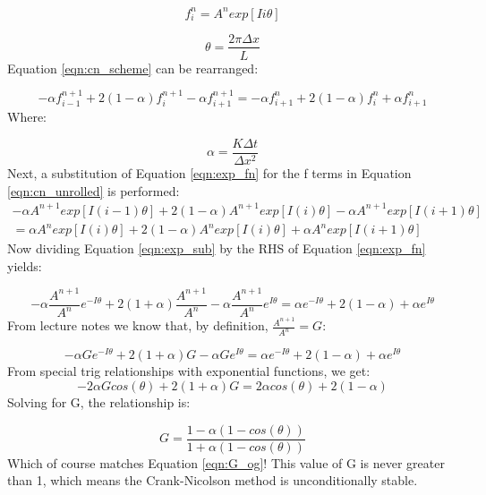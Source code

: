 \documentclass[12pt]{article}
\begin{document}
\begin{equation}
f_i^n = A^n exp\left[Ii\theta\right]
\label{eqn:exp_fn}
\end{equation}
	
\begin{equation}
\theta = \frac{2\pi \Delta x}{L}
\end{equation}
\noindent
Equation \ref{eqn:cn_scheme} can be rearranged:

\begin{equation}
 -\alpha f_{i-1}^{n+1} + 2(1-\alpha)f_i^{n+1} -\alpha f_{i+1}^{n+1} = - \alpha f_{i+1}^n + 2(1-\alpha)f_i^n + \alpha f^n_{i+1}
 \label{eqn:cn_unrolled}
\end{equation}
\noindent
Where:

\begin{equation}
	\alpha = \frac{K \Delta t}{\Delta x^2}
\end{equation}
\noindent
Next, a substitution of Equation \ref{eqn:exp_fn} for the f terms in Equation \ref{eqn:cn_unrolled} is performed:
\begin{equation}
\begin{aligned}
	 -\alpha A^{n+1} exp\left[I(i-1)\theta\right] + 2(1-\alpha)A^{n+1} exp\left[I(i)\theta\right] -\alpha A^{n+1} exp\left[I(i+1)\theta\right]\\=\alpha A^{n} exp\left[I(i)\theta\right] + 2(1-\alpha)A^{n} exp\left[I(i)\theta\right] + \alpha A^{n} exp\left[I(i+1)\theta\right]
\end{aligned}
	 \label{eqn:exp_sub}
\end{equation}
\noindent
Now dividing Equation \ref{eqn:exp_sub} by the RHS of Equation \ref{eqn:exp_fn} yields:

\begin{equation}
	-\alpha \frac{A^{n+1}}{A^n} e^{-I\theta} + 2(1+\alpha)\frac{A^{n+1}}{A^n} - \alpha \frac{A^{n+1}}{A^n} e^{I\theta} = \alpha e^{-I\theta} + 2(1-\alpha) + \alpha e^{I\theta}
	\label{eqn:divide_an_term}
\end{equation}
\noindent
From lecture notes we know that, by definition, $\frac{A^{n+1}}{A^n} = G$:

\begin{equation}
-\alpha G e^{-I\theta} + 2(1+\alpha)G - \alpha G e^{I\theta} = \alpha e^{-I\theta} + 2(1-\alpha) + \alpha e^{I\theta}
\label{eqn:sub_G}
\end{equation}
\noindent
From special trig relationships with exponential functions, we get:
\begin{equation}
-2\alpha G cos(\theta) + 2(1+\alpha)G = 2\alpha cos(\theta) + 2(1-\alpha)
\label{eqn:cos_relation}
\end{equation}
\noindent
Solving for G, the relationship is:

\begin{equation}
G = \frac{1 - \alpha(1-cos(\theta))}{1 + \alpha(1-cos(\theta))}
\end{equation}
\noindent
Which of course matches Equation \ref{eqn:G_og}! This value of G is never greater than 1, which means the Crank-Nicolson method is unconditionally stable.
\end{document}
